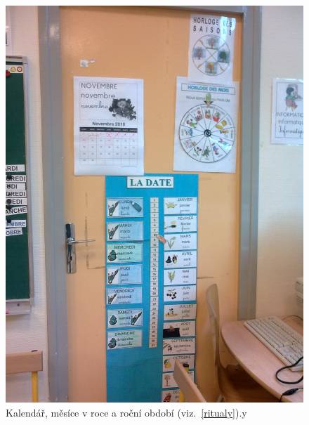 	\begin{figure}[tb]
		\centering
		\includegraphics[height=0.35\textheight]{./fotky/Obr12.jpg}
		\caption{
			Kalendář, měsíce v roce a roční období (viz.~\ref{ritualy}).y
		}
		\label{Obr12}
	\end{figure}


